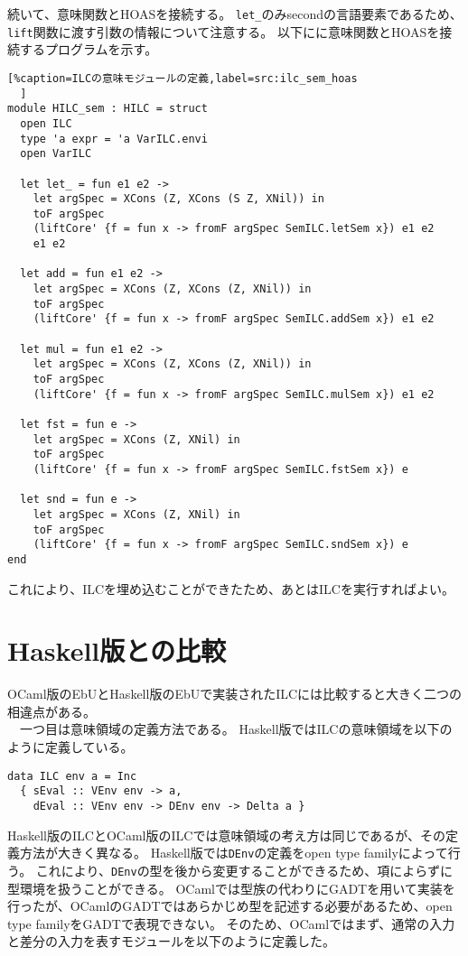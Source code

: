 \documentclass[uplatex]{sumiilab-paper}
\theoremstyle{mystyle}
\numberwithin{definition}{chapter} %
\begin{document}
続いて、意味関数とHOASを接続する。
{\tt let\_}のみsecondの言語要素であるため、{\tt lift}関数に渡す引数の情報について注意する。
以下にに意味関数とHOASを接続するプログラムを示す。

\begin{lstlisting}[%caption=ILCの意味モジュールの定義,label=src:ilc_sem_hoas
  ]
module HILC_sem : HILC = struct 
  open ILC 
  type 'a expr = 'a VarILC.envi 
  open VarILC

  let let_ = fun e1 e2 -> 
    let argSpec = XCons (Z, XCons (S Z, XNil)) in
    toF argSpec 
    (liftCore' {f = fun x -> fromF argSpec SemILC.letSem x}) e1 e2
    e1 e2 

  let add = fun e1 e2 -> 
    let argSpec = XCons (Z, XCons (Z, XNil)) in 
    toF argSpec 
    (liftCore' {f = fun x -> fromF argSpec SemILC.addSem x}) e1 e2 

  let mul = fun e1 e2 -> 
    let argSpec = XCons (Z, XCons (Z, XNil)) in 
    toF argSpec 
    (liftCore' {f = fun x -> fromF argSpec SemILC.mulSem x}) e1 e2 

  let fst = fun e -> 
    let argSpec = XCons (Z, XNil) in 
    toF argSpec 
    (liftCore' {f = fun x -> fromF argSpec SemILC.fstSem x}) e 

  let snd = fun e -> 
    let argSpec = XCons (Z, XNil) in 
    toF argSpec 
    (liftCore' {f = fun x -> fromF argSpec SemILC.sndSem x}) e 
end
\end{lstlisting}

これにより、ILCを埋め込むことができたため、あとはILCを実行すればよい。

\section{Haskell版との比較}
OCaml版のEbUとHaskell版のEbUで実装されたILCには比較すると大きく二つの相違点がある。\\
　一つ目は意味領域の定義方法である。
Haskell版ではILCの意味領域を以下のように定義している。

\begin{lstlisting}[caption=HaskellにおけるILCの意味領域,label=src:haskell_ilc_sem_dom]
data ILC env a = Inc
  { sEval :: VEnv env -> a, 
    dEval :: VEnv env -> DEnv env -> Delta a }
\end{lstlisting}

Haskell版のILCとOCaml版のILCでは意味領域の考え方は同じであるが、その定義方法が大きく異なる。
Haskell版では{\tt DEnv}の定義をopen type familyによって行う。
これにより、{\tt DEnv}の型を後から変更することができるため、項によらずに型環境を扱うことができる。
OCamlでは型族の代わりにGADTを用いて実装を行ったが、OCamlのGADTではあらかじめ型を記述する必要があるため、open type familyをGADTで表現できない。
そのため、OCamlではまず、通常の入力と差分の入力を表すモジュールを以下のように定義した。
\end{document}
